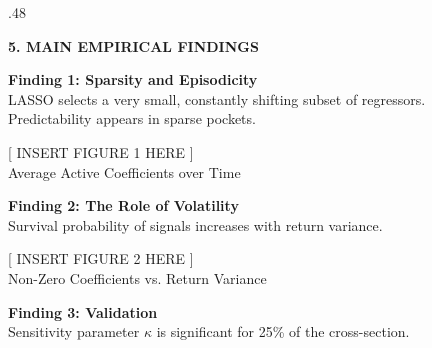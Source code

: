 \documentclass[final]{beamer}
\begin{document}
\begin{frame}[t, plain]
\begin{columns}[t]
\begin{column}{.48\textwidth}
\begin{center}
                \vspace{1cm}

                \begin{tcolorbox}[basebox]
                    {\color{blue900}\Large\textbf{5. MAIN EMPIRICAL FINDINGS}} \vspace{0.5cm}
                    
                    {\color{blue800}\textbf{Finding 1: Sparsity and Episodicity}} \\
                    LASSO selects a very small, constantly shifting subset of regressors. Predictability appears in sparse pockets.
                    
                    \begin{center}
                        \begin{tcolorbox}[colback=gray200, colframe=gray400, width=0.8\textwidth, height=6cm, valign=center, center upper]
                            \color{gray800} [ INSERT FIGURE 1 HERE ] \\
                            \small Average Active Coefficients over Time
                        \end{tcolorbox}
                    \end{center}

                    {\color{blue800}\textbf{Finding 2: The Role of Volatility}} \\
                    Survival probability of signals increases with return variance.
                    
                    \begin{center}
                        \begin{tcolorbox}[colback=gray200, colframe=gray400, width=0.8\textwidth, height=6cm, valign=center, center upper]
                            \color{gray800} [ INSERT FIGURE 2 HERE ] \\
                            \small Non-Zero Coefficients vs. Return Variance
                        \end{tcolorbox}
                    \end{center}

                    {\color{blue800}\textbf{Finding 3: Validation}} \\
                    Sensitivity parameter $\kappa$ is significant for 25\% of the cross-section.
                \end{tcolorbox}


\end{center}
\end{column}
\end{columns}
\end{frame}
\end{document}
